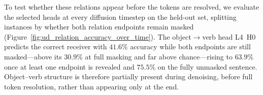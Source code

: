 \documentclass{article} %
\begin{document}

To test whether these relations appear before the tokens are resolved, we evaluate the selected heads at every diffusion timestep on the held-out set, splitting instances by whether both relation endpoints remain masked (Figure~\ref{fig:ud_relation_accuracy_over_time}). The object$\to$verb head L4~H0 predicts the correct receiver with $41.6\%$ accuracy while both endpoints are still masked---above its $30.9\%$ at full masking and far above chance---rising to $63.9\%$ once at least one endpoint is revealed and $75.5\%$ on the fully unmasked sentence. Object--verb structure is therefore partially present during denoising, before full token resolution, rather than appearing only at the end.
\end{document}
